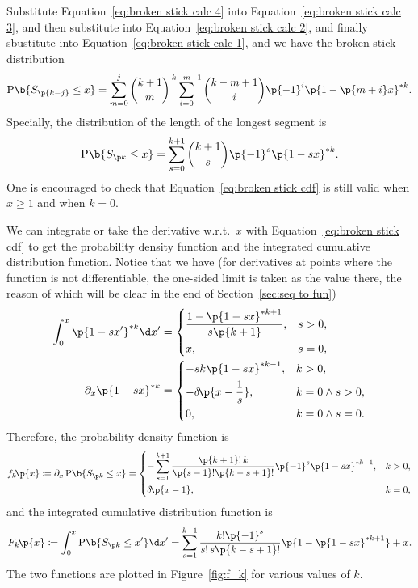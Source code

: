 \documentclass[oneside,12pt,final]{ucthesis-CA2012}
\newcommand{\dlt}{\delta}
\newcommand{\ceq}{\coloneqq}
\newcommand{\fr}{\frac}
\newcommand{\opn}{\operatorname}
\newcommand{\fc}[2]{#1\mathchoice{\!}{\!}{}{}\p{#2}} %
\newcommand{\bfc}[2]{#1\mathchoice{\!}{\!}{}{}\b{#2}} %
\newcommand{\bopc}[2]{\bfc{\opn{#1}}{#2}} %
\begin{document}
\begin{mainmatter}
Substitute Equation~\ref{eq:broken stick calc 4} into Equation~\ref{eq:broken stick calc 3},
and then substitute into Equation~\ref{eq:broken stick calc 2},
and finally sbustitute into Equation~\ref{eq:broken stick calc 1},
and we have the broken stick distribution
\[\bopc P{S_{\p{k-j}}\le x}=\sum_{m=0}^j
\binom{k+1}m\sum_{i=0}^{k-m+1}\binom{k-m+1}i\p{-1}^i\p{1-\p{m+i}x}^{*k}.\]
Specially, the distribution of the length of the longest segment is
\begin{equation}
	\label{eq:broken stick cdf}
	\bopc P{S_{\p k}\le x}
	=\sum_{s=0}^{k+1}\binom{k+1}s\p{-1}^s\p{1-sx}^{*k}.
\end{equation}
One is encouraged to check that Equation~\ref{eq:broken stick cdf}
is still valid when $x\ge1$ and when $k=0$.

We can integrate or take the derivative w.r.t.\ $x$ with Equation~\ref{eq:broken stick cdf}
to get the probability density function and the integrated cumulative distribution function.
Notice that we have
(for derivatives at points where the function is not differentiable,
the one-sided limit is taken as the value there,
the reason of which will be clear in the end of Section~\ref{sec:seq to fun})
\begin{align*}
	\int_0^x\p{1-sx'}^{*k}\d x'&=\begin{dcases}
		\fr{1-\p{1-sx}^{*k+1}}{s\p{k+1}},&s>0,\\
		x,&s=0,
	\end{dcases}\\
	\partial_x\p{1-sx}^{*k}&=\begin{dcases}
		-sk\p{1-sx}^{*k-1},&k>0,\\
		-\fc\dlt{x-\fr1s},&k=0\land s>0,\\
		0,&k=0\land s=0.
	\end{dcases}
\end{align*}
Therefore, the probability density function is
\begin{equation}
	\label{eq:f_k}
	\fc{f_k}x\ceq\partial_x\bopc P{S_{\p k}\le x}
	=\begin{dcases}
		-\sum_{s=1}^{k+1}\fr{\p{k+1}!\,k}{\p{s-1}!\p{k-s+1}!}\p{-1}^s\p{1-sx}^{*k-1},&k>0,\\
		\fc\dlt{x-1},&k=0,
	\end{dcases}
\end{equation}
and the integrated cumulative distribution function is
\begin{equation}
	\label{eq:F_k}
	\fc{F_k}x\ceq\int_0^x\bopc P{S_{\p k}\le x'}\d x'
	=\sum_{s=1}^{k+1}\fr{k!\p{-1}^s}{s!\,s\p{k-s+1}!}\p{1-\p{1-sx}^{*k+1}}+x.
\end{equation}
The two functions are plotted in Figure~\ref{fig:f_k} for various values of $k$.


\end{mainmatter}
\end{document}
